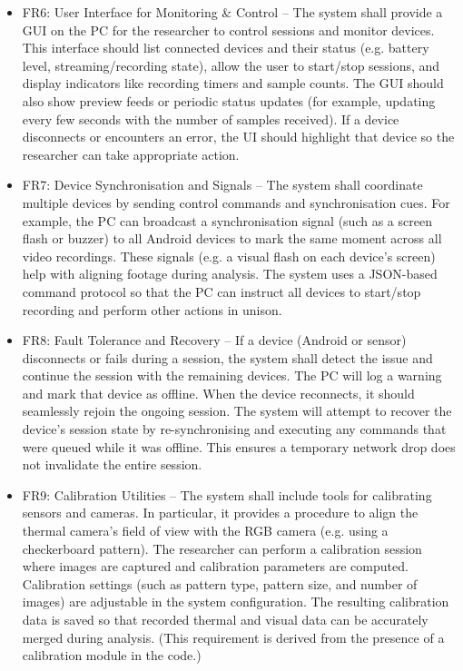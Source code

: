 \begin{itemize}
    \item FR6: User Interface for Monitoring \& Control -- The system shall provide a GUI on the PC for the researcher to control sessions and monitor devices. This interface should list connected devices and their status (e.g. battery level, streaming/recording state), allow the user to start/stop sessions, and display indicators like recording timers and sample counts. The GUI should also show preview feeds or periodic status updates (for example, updating every few seconds with the number of samples received). If a device disconnects or encounters an error, the UI should highlight that device so the researcher can take appropriate action.

    \item FR7: Device Synchronisation and Signals -- The system shall coordinate multiple devices by sending control commands and synchronisation cues. For example, the PC can broadcast a synchronisation signal (such as a screen flash or buzzer) to all Android devices to mark the same moment across all video recordings. These signals (e.g. a visual flash on each device's screen) help with aligning footage during analysis. The system uses a JSON-based command protocol so that the PC can instruct all devices to start/stop recording and perform other actions in unison.

    \item FR8: Fault Tolerance and Recovery -- If a device (Android or sensor) disconnects or fails during a session, the system shall detect the issue and continue the session with the remaining devices. The PC will log a warning and mark that device as offline. When the device reconnects, it should seamlessly rejoin the ongoing session. The system will attempt to recover the device's session state by re-synchronising and executing any commands that were queued while it was offline. This ensures a temporary network drop does not invalidate the entire session.

    \item FR9: Calibration Utilities -- The system shall include tools for calibrating sensors and cameras. In particular, it provides a procedure to align the thermal camera's field of view with the RGB camera (e.g. using a checkerboard pattern). The researcher can perform a calibration session where images are captured and calibration parameters are computed. Calibration settings (such as pattern type, pattern size, and number of images) are adjustable in the system configuration. The resulting calibration data is saved so that recorded thermal and visual data can be accurately merged during analysis. (This requirement is derived from the presence of a calibration module in the code.)


\end{itemize}
